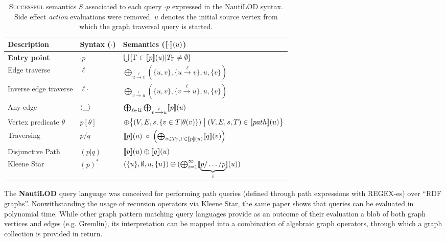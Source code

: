 \begin{table}
	\centering
	\begin{tabular}{l|ll}
		\toprule
		 Description & Syntax ($\cdot$) & Semantics ($[\! [\cdot]\!](u)$)\\
		\midrule
		\textbf{Entry point} & $\cdot p$ & $\bigcup\{\Gamma\in [\! [{p}]\!](u)|T_\Gamma\neq \emptyset\}$\\
		\midrule
		Edge traverse & $\ell$ & $\bigoplus_{u\overset{\ell}{\longrightarrow}v}(\{u,v\},\{u\overset{\ell}{\longrightarrow}v\},u,\{v\})$\\
		Inverse edge traverse & $\ell\;\hat{}$ & $\bigoplus_{v\overset{\ell}{\longrightarrow}u}(\{u,v\},\{v\overset{\ell}{\longrightarrow}u\},u,\{v\})$\\
		Any edge & $\Braket{\_}$ & $\bigoplus_{\ell\in \mathcal{U}}\bigoplus_{v\overset{\ell}{\longrightarrow}u} [\! [p]\!](u)$\\
		Vertex predicate $\theta$ & $p[\theta]$ & $\oplus\big\{(V,E,s,\{v\in T|\theta(v)\})\;\big|\;(V,E,s,T)\in [\! [path]\!](u)\big\}$\\
		Traversing & $p/q$ &  $[\! [p]\!](u)\;\circ\;\left(\bigoplus_{v\in T_\Gamma,\Gamma\in [\! [p]\!](u)} [\! [q]\!](v)\right)$\\
		Disjunctive Path & $(p|q)$ & $[\! [p]\!](u)\oplus[\! [q]\!](u)$\\
		Kleene Star & $(p)^*$ & $(\{u\},\emptyset,u,\{u\})\oplus(\bigoplus_{i=1}^\infty [\! [\underbrace{p/\dots/p}_i]\!](u))$\\
		\bottomrule
	\end{tabular}
	\caption{\textsc{Successful} semantics $S$ associated to each query $\cdot p$ expressed in the NautiLOD syntax. Side effect \textit{action} evaluations were removed. $u$ denotes the initial source vertex from which the graph traversal query is started.
	}
	\label{tab:nautilodSem}
\end{table}


The \textbf{NautiLOD} \cite{NautiLOD} query language was conceived for performing path queries (defined through
path expressions with REGEX-es) over
``RDF graphs''. Nonwithstanding the usage of recursion operators via Kleene Star, the same paper shows  that queries can be evaluated in polynomial time.
While other graph pattern matching query languages provide as an outcome of their evaluation a blob of both graph vertices and edges (e.g. Gremlin), its interpretation can be mapped into a combination of algebraic graph operators, through which a graph collection is provided in return.  %

